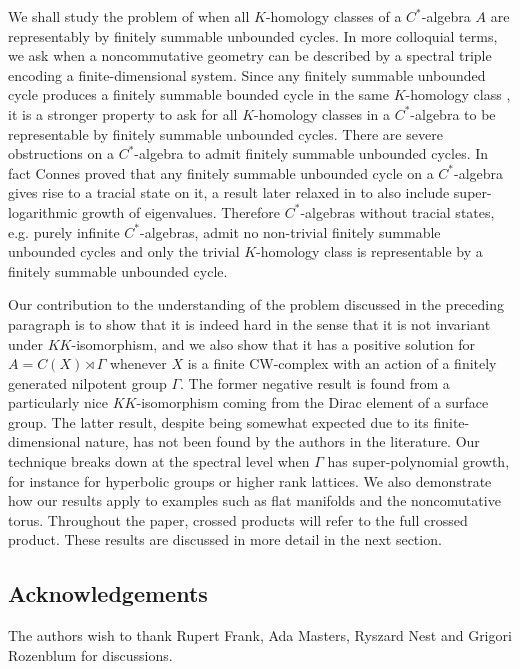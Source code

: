 \documentclass[a4paper,reqno]{amsart}
\numberwithin{equation}{section}
\theoremstyle{definition}
\theoremstyle{remark}
\begin{document}
We shall study the problem of when all $K$-homology classes of a $C^*$-algebra $A$ are representably by finitely summable unbounded cycles. In more colloquial terms, we ask when a noncommutative geometry can be described by a spectral triple encoding a finite-dimensional system. Since any finitely summable unbounded cycle produces a finitely summable bounded cycle in the same $K$-homology class \cite{baajjulg,sww}, it is a stronger property to ask for all $K$-homology classes in a $C^*$-algebra to be representable by finitely summable unbounded cycles. There are severe obstructions on a $C^*$-algebra to admit finitely summable unbounded cycles. In fact Connes \cite{ConnesETDS} proved that any finitely summable unbounded cycle on a $C^*$-algebra gives rise to a tracial state on it, a result later relaxed in \cite{GRU} to also include super-logarithmic growth of eigenvalues. Therefore $C^*$-algebras without tracial states, e.g. purely infinite $C^*$-algebras, admit no non-trivial finitely summable unbounded cycles and only the trivial $K$-homology class is representable by a finitely summable unbounded cycle.


Our contribution to the understanding of the problem discussed in the preceding paragraph is to show that it is indeed hard in the sense that it is not invariant under $KK$-isomorphism, and we also show that it has a positive solution for $A=C(X)\rtimes \Gamma$ whenever $X$ is a finite CW-complex with an action of a finitely generated nilpotent group $\Gamma$. The former negative result is found from a particularly nice $KK$-isomorphism coming from the Dirac element of a surface group. The latter result, despite being somewhat expected due to its finite-dimensional nature, has not been found by the authors in the literature. Our technique breaks down at the spectral level when $\Gamma$ has super-polynomial growth, for instance for hyperbolic groups or higher rank lattices. We also demonstrate how our results apply to examples such as flat manifolds and the noncomutative torus. Throughout the paper, crossed products will refer to the full crossed product. These results are discussed in more detail in the next section.



\subsection*{Acknowledgements} The authors wish to thank Rupert Frank, Ada Masters, Ryszard Nest and Grigori Rozenblum for discussions. 
\end{document}
